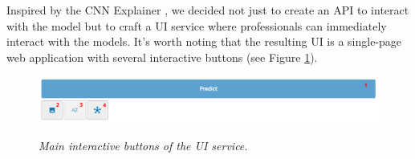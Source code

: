 Inspired by the CNN Explainer \cite{CNNExplainer}, we decided not just to
create an API to interact with the model but to craft a UI service where
professionals can immediately interact with the models. It's worth noting that
the resulting UI is a single-page web application with several interactive
buttons (see Figure \ref{fig:ui-tools}).

\begin{figure}[H]
  \centering
  \includegraphics[width=\textwidth]{imatges/results/ui-tools.png}
  \caption[Main interactive buttons of the UI service]{\textit{Main interactive buttons of the UI service. }}
  {\label{fig:ui-tools}}
\end{figure}


